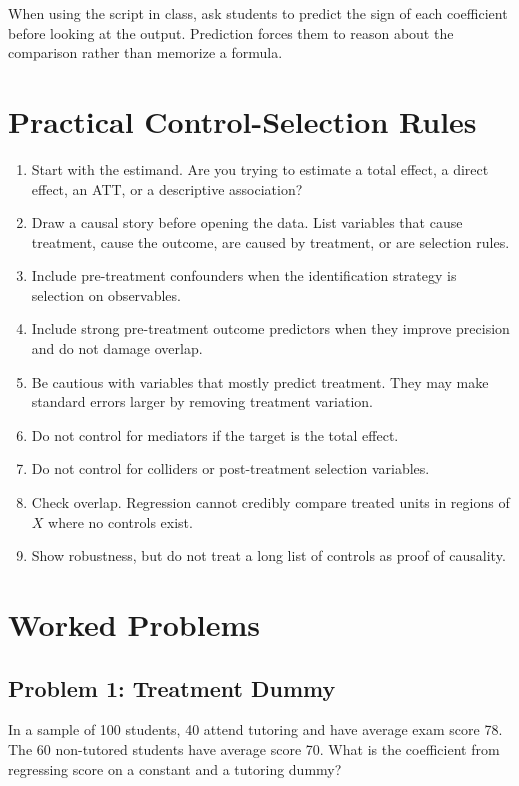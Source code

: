 When using the script in class, ask students to predict the sign of each
coefficient before looking at the output. Prediction forces them to reason
about the comparison rather than memorize a formula.

\section{Practical Control-Selection Rules}

\begin{enumerate}
\item Start with the estimand. Are you trying to estimate a total effect, a
direct effect, an ATT, or a descriptive association?
\item Draw a causal story before opening the data. List variables that cause
treatment, cause the outcome, are caused by treatment, or are selection rules.
\item Include pre-treatment confounders when the identification strategy is
selection on observables.
\item Include strong pre-treatment outcome predictors when they improve
precision and do not damage overlap.
\item Be cautious with variables that mostly predict treatment. They may make
standard errors larger by removing treatment variation.
\item Do not control for mediators if the target is the total effect.
\item Do not control for colliders or post-treatment selection variables.
\item Check overlap. Regression cannot credibly compare treated units in
regions of $X$ where no controls exist.
\item Show robustness, but do not treat a long list of controls as proof of
causality.
\end{enumerate}

\section{Worked Problems}

\subsection{Problem 1: Treatment Dummy}

In a sample of 100 students, 40 attend tutoring and have average exam score
78. The 60 non-tutored students have average score 70. What is the coefficient
from regressing score on a constant and a tutoring dummy?

